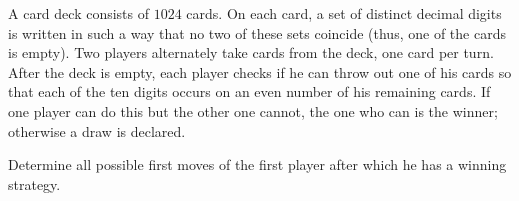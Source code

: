 A card deck consists of $1024$ cards. On each card, a set of distinct decimal digits is written in such a way that no two of these sets coincide (thus, one of the cards is empty). Two players alternately take cards from the deck, one card per turn. After the deck is empty, each player checks if he can throw out one of his cards so that each of the ten digits occurs on an even number of his remaining cards. If one player can do this but the other one cannot, the one who can is the winner; otherwise a draw is declared.

Determine all possible first moves of the first player after which he has a winning strategy.

